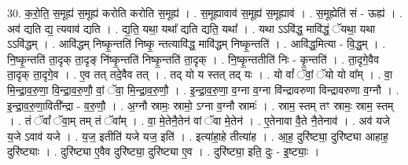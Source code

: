 \documentclass[17pt]{extarticle}
\begin{document}
30. क॒रो॒ति॒ स॒मूह्य॑ स॒मूह्य॑ करोति करोति स॒मूह्य॑ । . स॒मूह्यावाव॑ स॒मूह्य॑ स॒मूह्याव॑ । . स॒मूह्येति॑ सं - ऊह्य॑ । . अव॑ द्यति द्य॒ त्यवाव॑ द्यति । . द्य॒ति॒ यथा॒ यथा᳚ द्यति द्यति॒ यथा᳚ । . यथा ऽऽवि॑द्ध॒ मावि॑द्धं॒ ॅयथा॒ यथा ऽऽवि॑द्धम् । . आवि॑द्धम् निष्कृ॒न्तति॑ निष्कृ॒ न्तत्यावि॑द्ध॒ मावि॑द्धम् निष्कृ॒न्तति॑ । . आवि॑द्ध॒मित्या - वि॒द्ध॒म् । . नि॒ष्कृ॒न्तति॑ ता॒दृक् ता॒दृङ् नि॑ष्कृ॒न्तति॑ निष्कृ॒न्तति॑ ता॒दृक् । . नि॒ष्कृ॒न्ततीति॑ निः - कृ॒न्तति॑ । . ता॒दृगे॒वैव ता॒दृक् ता॒दृगे॒व । . ए॒व तत् तदे॒वैव तत् । . तद् यो य स्तत् तद् यः । . यो वां᳚ ॅवां॒ ॅयो यो वा᳚म् । . वा॒ मि॒न्द्रा॒व॒रु॒णा॒ वि॒न्द्रा॒व॒रु॒णौ॒ वां॒ ॅवा॒ मि॒न्द्रा॒व॒रु॒णौ॒ । . इ॒न्द्रा॒व॒रु॒णा॒ व॒ग्ना व॒ग्ना वि॑न्द्रावरुणा विन्द्रावरुणा व॒ग्नौ । . इ॒न्द्रा॒व॒रु॒णा॒विती᳚न्द्रा - व॒रु॒णौ॒ । . अ॒ग्नौ स्रामः॒ स्रामो॒ ऽग्ना व॒ग्नौ स्रामः॑ । . स्राम॒ स्तम् तꣳ स्रामः॒ स्राम॒ स्तम् । . तं ॅवां᳚ ॅवा॒म् तम् तं ॅवा᳚म् । . वा॒ मे॒तेनै॒तेन॑ वां ॅवा मे॒तेन॑ । . ए॒तेनावा वै॒ते नै॒तेनाव॑ । . अव॑ यजे य॒जे ऽवाव॑ यजे । . य॒ज॒ इतीति॑ यजे यज॒ इति॑ । . इत्या॑हा॒हे तीत्या॑ह । . आ॒ह॒ दुरि॑ष्ट्या॒ दुरि॑ष्ट्या आहाह॒ दुरि॑ष्ट्याः । . दुरि॑ष्ट्या ए॒वैव दुरि॑ष्ट्या॒ दुरि॑ष्ट्या ए॒व । . दुरि॑ष्ट्या॒ इति॒ दुः - इ॒ष्ट्याः॒ । \newline
\end{document}
